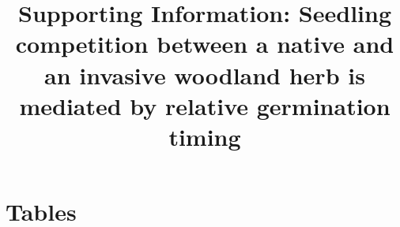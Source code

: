 \documentclass{article}
\title{Supporting Information: Seedling competition between a native %
and an invasive %
woodland herb is mediated by relative germination timing}
\date{}
\begin{document}

\maketitle
\section*{Tables}
\end{document}
